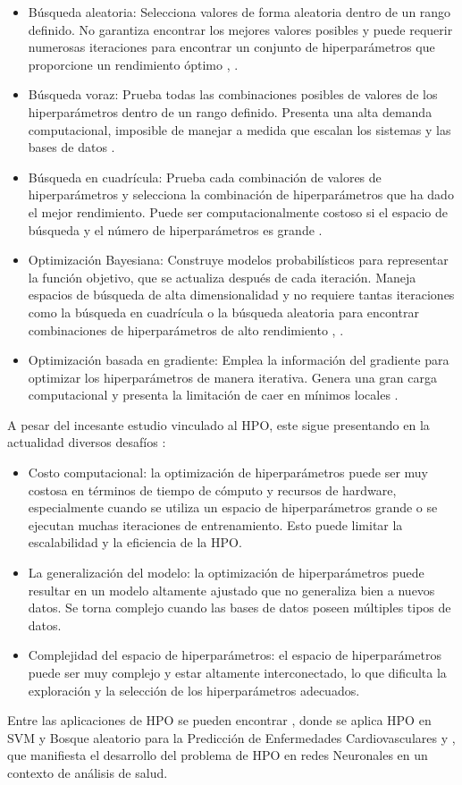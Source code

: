 \begin{itemize}
	\item Búsqueda aleatoria: Selecciona valores de forma aleatoria dentro de un rango definido. No garantiza encontrar los mejores valores posibles y puede requerir numerosas iteraciones para encontrar un conjunto de hiperparámetros que proporcione un rendimiento óptimo \citep{geron2022hands}, \citep{zoller2021benchmark}.
	\item Búsqueda voraz: Prueba todas las combinaciones posibles de valores de los hiperparámetros dentro de un rango definido. Presenta una alta demanda computacional, imposible de manejar a medida que escalan los sistemas y las bases de datos \citep{zoller2021benchmark}.
	\item Búsqueda en cuadrícula: Prueba cada combinación de valores de hiperparámetros y selecciona la combinación de hiperparámetros que ha dado el mejor rendimiento. Puede ser computacionalmente costoso si el espacio de búsqueda y el número de hiperparámetros es grande \citep{he2021automl}.
	\item Optimización Bayesiana: Construye modelos probabilísticos para representar la función objetivo, que se actualiza después de cada iteración. Maneja espacios de búsqueda de alta dimensionalidad y no requiere tantas iteraciones como la búsqueda en cuadrícula o la búsqueda aleatoria para encontrar combinaciones de hiperparámetros de alto rendimiento \citep{hutter2019automated}, \citep{he2021automl}.
	\item Optimización basada en gradiente: Emplea la información del gradiente para optimizar los hiperparámetros de manera iterativa. Genera una gran carga computacional y presenta la limitación de caer en mínimos locales \citep{zoller2021benchmark}.
\end{itemize} 
A pesar del incesante estudio vinculado al HPO, este sigue presentando en la actualidad diversos desafíos \citep{hutter2019automated}:
\begin{itemize}
	\item Costo computacional: la optimización de hiperparámetros puede ser muy costosa en términos de tiempo de cómputo y recursos de hardware, especialmente cuando se utiliza un espacio de hiperparámetros grande o se ejecutan muchas iteraciones de entrenamiento. Esto puede limitar la escalabilidad y la eficiencia de la HPO.
	\item La generalización del modelo: la optimización de hiperparámetros puede resultar en un modelo altamente ajustado que no generaliza bien a nuevos datos. Se torna complejo cuando las bases de datos poseen múltiples tipos de datos.
	\item Complejidad del espacio de hiperparámetros: el espacio de hiperparámetros puede ser muy complejo y estar altamente interconectado, lo que dificulta la exploración y la selección de los hiperparámetros adecuados.
\end{itemize}
Entre las aplicaciones de HPO se pueden encontrar \citep{hernandeztecnicas}, donde se aplica HPO en SVM y Bosque aleatorio para la Predicción de Enfermedades Cardiovasculares y \citep{waring2020automated}, que manifiesta el desarrollo del problema de HPO en redes Neuronales en un contexto de análisis de salud.
 
